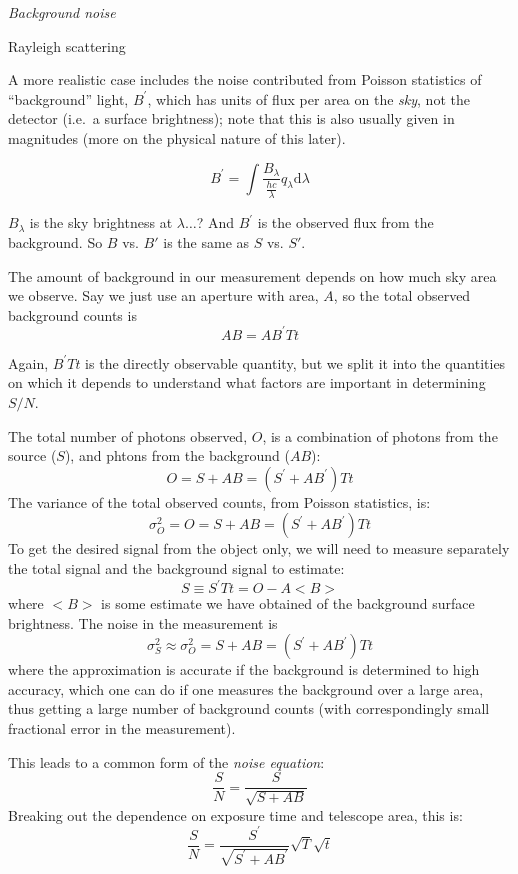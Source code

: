 \documentclass[12pt]{article}
\begin{document}
\textcolor{om}{\emph{}}

\emph{Background noise}

\textcolor{myBlue}{Rayleigh scattering}

A more realistic case includes the noise contributed from Poisson
statistics of ``background'' light, $B^{\prime}$,
which has units of flux per area
on the \emph{sky}, not the detector
(i.e.\ a surface brightness); note that this is also usually
given in magnitudes (more on the physical nature of
this later).

    $$ B^{\prime} = \int \frac{B_{\lambda}}{\frac{hc}{\lambda}}
       q_{\lambda}\textrm{d}\lambda $$

\textcolor{myBlue}{$B_{\lambda}$ is the sky brightness at $\lambda
\ldots$? And $B^{\prime}$ is the observed flux from the background.
So $B$ vs. $B'$ is the same as $S$ vs. $S'$.}

The amount of background in our measurement depends on
how much sky area we observe. Say we just
use an aperture with area, $A$, so the total observed background counts
is
    $$ AB = AB^{\prime}Tt $$

Again, $B^{\prime}Tt$ is the directly observable quantity,
but we split it into the quantities on which it depends to understand
what factors are important in determining $S/N$.

The total number of photons observed, $O$, is a combination of
photons from the source ($S$), and phtons from the background ($AB$):
    $$ O = S + AB = (S^{\prime} + AB^{\prime})Tt $$
The variance of the total observed counts, from Poisson statistics,
is:
    $$ \sigma^2_O = O =  S + AB = (S^{\prime} + AB^{\prime})Tt $$
To get the desired signal from the object only, we will need to
measure separately the total signal and the background signal to
estimate:
    $$ S \equiv S^{\prime}Tt = O-A <B> $$
where $<B>$ is some estimate we have obtained of the background
surface brightness. The noise in the measurement is
    $$ \sigma^2_S \approx \sigma^2_O =
    S + AB = (S^{\prime} + AB^{\prime})Tt $$
where the approximation is accurate if the background is determined to
high accuracy, which one can do if one measures the background over a
large area, thus getting a large number of background counts (with
correspondingly small fractional error in the measurement).

This leads to a common form of the \emph{noise equation}:
    $$ \frac{S}{N} = \frac{S}{\sqrt{S+AB}}  $$
Breaking out the dependence on exposure time and telescope area, this
is:
    $$ \frac{S}{N} = \frac{S^{\prime}}
    {\sqrt{S^{\prime}+AB^{\prime}}}
    \sqrt{T}\sqrt{t}$$
\end{document}
